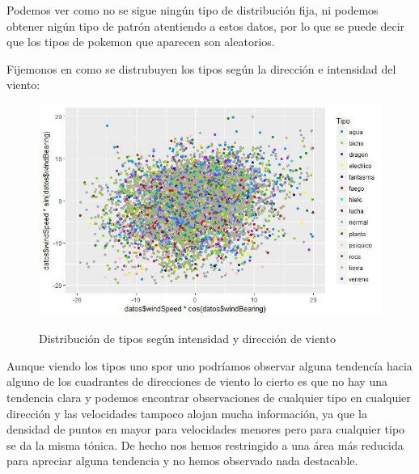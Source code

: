 Podemos ver como no se sigue ningún tipo de distribución fija, ni podemos obtener nigún tipo de patrón atentiendo a estos datos, por lo que se puede decir que los tipos de pokemon que aparecen son aleatorios.

Fijemonos en como se distrubuyen los tipos según la dirección e intensidad del viento:

\begin{figure}[H] %
\centering
\includegraphics[scale=0.8]{img/viento.jpg}  %
\label{img/viento.jpg}
\caption{Distribución de tipos según intensidad y dirección de viento}
\end{figure}

Aunque viendo los tipos uno spor uno podríamos observar alguna tendencía hacia alguno de los cuadrantes de direcciones de viento lo cierto es que no hay una tendencia clara y podemos encontrar observaciones de cualquier tipo en cualquier dirección y las velocidades tampoco alojan mucha información, ya que la densidad de puntos en mayor para velocidades menores pero para cualquier tipo se da la misma tónica. De hecho nos hemos restringido a una área más reducida para apreciar alguna tendencia y no hemos observado nada destacable.



















